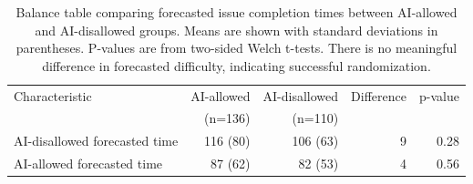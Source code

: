 \begin{table}[htbp]
\centering \small
\begin{tabular}{lrrrr}
\toprule
Characteristic & AI-allowed & AI-disallowed & Difference & p-value \\
 & (n=136) & (n=110) & & \\
\midrule
AI-disallowed forecasted time & 116 (80) & 106 (63) & 9 & 0.28 \\
AI-allowed forecasted time & 87 (62) & 82 (53) & 4 & 0.56 \\
\bottomrule
\end{tabular}
\caption{Balance table comparing forecasted issue completion times between AI-allowed and AI-disallowed groups. Means are shown with standard deviations in parentheses. P-values are from two-sided Welch t-tests. There is no meaningful difference in forecasted difficulty, indicating successful randomization.}
\label{tab:balance_and_proportions}
\end{table}
